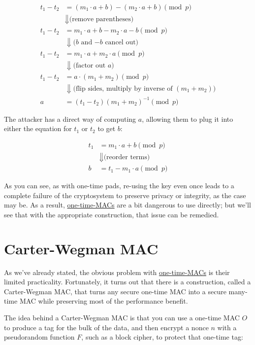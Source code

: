 \documentclass[11pt,ebook,table,dvipsnames]{memoir}
\begin{document}
\begin{align*}
  t_1 - t_2 &= (m_1 \cdot a + b) - (m_2 \cdot a + b) \pmod p \\
  &\Downarrow \text{(remove parentheses)} \\
  t_1 - t_2 &= m_1 \cdot a + b - m_2 \cdot a - b \pmod p \\
  &\Downarrow \text{($b$ and $-b$ cancel out)} \\
  t_1 - t_2 &= m_1 \cdot a + m_2 \cdot a \pmod p \\
  &\Downarrow \text{(factor out $a$)} \\
  t_1 - t_2 &= a \cdot (m_1 + m_2) \pmod p \\
  &\Downarrow \text{(flip sides, multiply by inverse of $(m_1 + m_2)$)} \\
  a &= (t_1 - t_2)(m_1 + m_2)^{-1} \pmod p
\end{align*}

The attacker has a direct way of computing $a$, allowing them to plug
it into either the equation for $t_1$ or $t_2$ to get $b$:

\begin{align*}
t_1 &= m_1 \cdot a + b \pmod p \\
&\Downarrow \text{(reorder terms)}\\
b &= t_1 - m_1 \cdot a \pmod p
\end{align*}

As you can see, as with one-time pads, re-using the key even once
leads to a complete failure of the cryptosystem to preserve privacy or
integrity, as the case may be. As a result, \hyperref[One-time MACs]{one-time-MACs} are a bit
dangerous to use directly; but we'll see that with the appropriate
construction, that issue can be remedied.
\section{\label{Carter-Wegman-MAC}Carter-Wegman MAC}
\label{sec-2-7-6}

As we've already stated, the obvious problem with \hyperref[One-time MACs]{one-time-MACs} is
their limited practicality. Fortunately, it turns out that there is a
construction, called a \gls{Carter-Wegman MAC}, that turns any secure
one-time MAC into a secure many-time MAC while preserving most of the
performance benefit.

The idea behind a \gls{Carter-Wegman MAC} is that you can use a
one-time MAC $O$ to produce a tag for the bulk of the data, and then
encrypt a nonce $n$ with a pseudorandom function $F$, such as a block
cipher, to protect that one-time tag:
\end{document}
